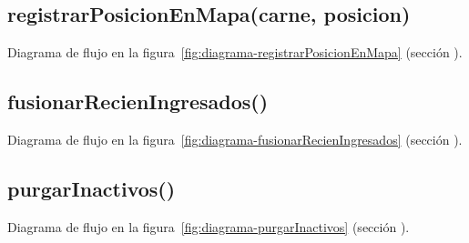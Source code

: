 \subsection{registrarPosicionEnMapa(carne, posicion)}


Diagrama de flujo en la figura~\ref{fig:diagrama-registrarPosicionEnMapa} (sección ).

\subsection{fusionarRecienIngresados()}


Diagrama de flujo en la figura~\ref{fig:diagrama-fusionarRecienIngresados} (sección ).

\subsection{purgarInactivos()}


Diagrama de flujo en la figura~\ref{fig:diagrama-purgarInactivos} (sección ).
